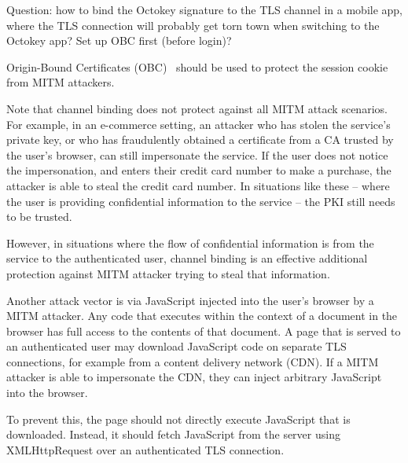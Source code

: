 Question: how to bind the Octokey signature to the TLS channel in a mobile app, where the TLS
connection will probably get torn town when switching to the Octokey app? Set up OBC first (before
login)?

Origin-Bound Certificates (OBC)~\cite{Dietz12} should be used to protect the session cookie from
MITM attackers.

Note that channel binding does not protect against all MITM attack scenarios. For example, in an
e-commerce setting, an attacker who has stolen the service's private key, or who has fraudulently
obtained a certificate from a CA trusted by the user's browser, can still impersonate the service.
If the user does not notice the impersonation, and enters their credit card number to make a
purchase, the attacker is able to steal the credit card number. In situations like these -- where
the user is providing confidential information to the service -- the PKI still needs to be trusted.

However, in situations where the flow of confidential information is from the service to the
authenticated user, channel binding is an effective additional protection against MITM attacker
trying to steal that information.

Another attack vector is via JavaScript injected into the user's browser by a MITM attacker. Any
code that executes within the context of a document in the browser has full access to the contents
of that document. A page that is served to an authenticated user may download JavaScript code on
separate TLS connections, for example from a content delivery network (CDN). If a MITM attacker is
able to impersonate the CDN, they can inject arbitrary JavaScript into the browser.

To prevent this, the page should not directly execute JavaScript that is downloaded. Instead, it
should fetch JavaScript from the server using XMLHttpRequest over an authenticated TLS connection. 
